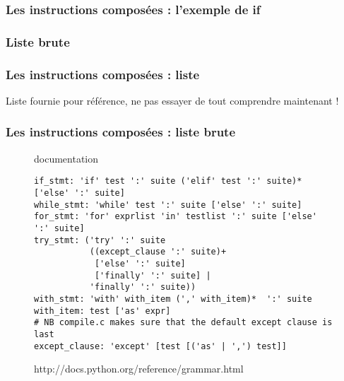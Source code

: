 \begin{frame}[fragile]
  \frametitle{Les instructions composées : l'exemple de if}
  \begin{ipython}
  \end{ipython}
\end{frame}

\subsubsection{Liste brute}
\begin{frame}[fragile]
  \frametitle{Les instructions composées : liste}
Liste fournie pour référence, ne pas essayer de tout comprendre maintenant !
\end{frame}

\begin{frame}[fragile]
  \frametitle{Les instructions composées : liste brute}
\begin{figure}
  \begin{beamercolorbox}{documentation}
\scriptsize\begin{verbatim}
if_stmt: 'if' test ':' suite ('elif' test ':' suite)* ['else' ':' suite]
while_stmt: 'while' test ':' suite ['else' ':' suite]
for_stmt: 'for' exprlist 'in' testlist ':' suite ['else' ':' suite]
try_stmt: ('try' ':' suite
           ((except_clause ':' suite)+
            ['else' ':' suite]
            ['finally' ':' suite] |
           'finally' ':' suite))
with_stmt: 'with' with_item (',' with_item)*  ':' suite
with_item: test ['as' expr]
# NB compile.c makes sure that the default except clause is last
except_clause: 'except' [test [('as' | ',') test]]
\end{verbatim}
  \end{beamercolorbox}
\def\figurename{extrait de la grammaire de Python}
\caption{http://docs.python.org/reference/grammar.html}
\end{figure}
\end{frame}


